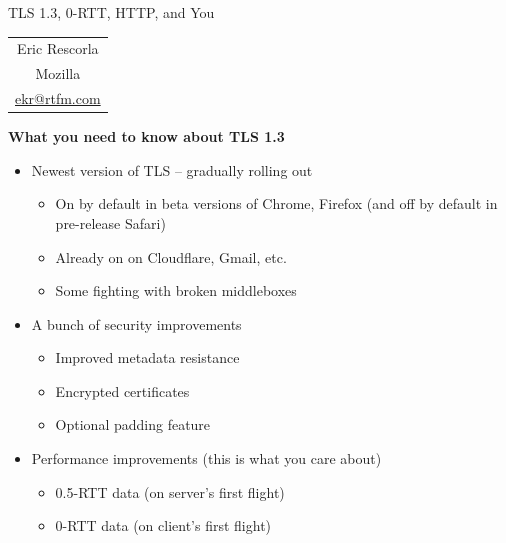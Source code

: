 \documentclass[helvetica]{seminar}
\newcommand{\heading}[1]{%
  \begin{center} 
    \large\bf 
    #1 
  \end{center} 
  \vspace{.4 in}}
\begin{document}
\centerslidestrue


\begin{slide}
\begin{center}
\vspace{1 in}
\LARGE{{\bf}TLS 1.3, 0-RTT, HTTP, and You} \\
\vspace{.2in}
\large{
\begin{tabular}{c}
Eric Rescorla\\
Mozilla\\
\url{ekr@rtfm.com}
\end{tabular}
}
\end{center}

\end{slide}

\centerslidesfalse

\begin{slide}
\heading{What you need to know about TLS 1.3}

\vspace{-5ex}
\begin{itemize}
\item Newest version of TLS -- gradually rolling out
  \begin{itemize}
  \item On by default in beta versions of Chrome, Firefox (and off by default in pre-release Safari)
  \item Already on on Cloudflare, Gmail, etc.
  \item Some fighting with broken middleboxes
  \end{itemize}
\item A bunch of security improvements
  \begin{itemize}
  \item Improved metadata resistance
  \item Encrypted certificates
  \item Optional padding feature
  \end{itemize}
\item Performance improvements (this is what you care about)
  \begin{itemize}
  \item 0.5-RTT data (on server’s first flight)
  \item 0-RTT data (on client’s first flight)
  \end{itemize}
\end{itemize}

\end{slide}
\end{document}
